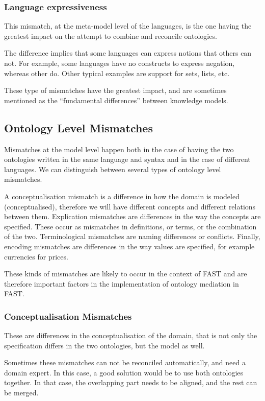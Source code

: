 \documentclass{fast_latex}
\begin{document}
\subsubsection{Language expressiveness}
This mismatch, at the meta-model level of the languages, is the one
having the greatest impact on the attempt to combine and reconcile
ontologies. 

The difference implies that some languages can express notions that
others can not. For example, some languages have no constructs to
express negation, whereas other do. Other typical examples are support
for sets, lists, etc. 

These type of mismatches have the greatest impact, and are sometimes
mentioned as the {\textquotedblleft}fundamental
differences{\textquotedblright} between knowledge models. 

\subsection{Ontology Level Mismatches}
\label{subsec:ontologymismatches_ontologylevel}
Mismatches at the model level happen both in the case of having the two
ontologies written in the same language and syntax and in the case of
different languages. We can distinguish between several types of
ontology level mismatches. 

A conceptualisation mismatch is a difference in how the domain is
modeled (conceptualised), therefore we will have different concepts and
different relations between them. Explication mismatches are
differences in the way the concepts are specified. These occur as
mismatches in definitions, or terms, or the combination of the two.
Terminological mismatches are naming differences or conflicts. Finally,
encoding mismatches are differences in the way values are specified,
for example currencies for prices. 

These kinds of mismatches are likely to occur in the context of FAST and
are therefore important factors in the implementation of ontology
mediation in FAST. 

\subsubsection{Conceptualisation Mismatches}
These are differences in the conceptualisation of the domain, that is
not only the specification differs in the two ontologies, but the model
as well. 

Sometimes these mismatches can not be reconciled automatically, and need
a domain expert. In this case, a good solution would be to use both
ontologies together. In that case, the overlapping part needs to be
aligned, and the rest can be merged. 
\end{document}
